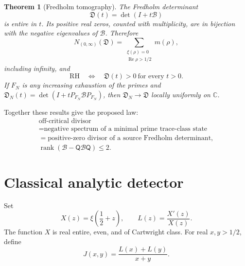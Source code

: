 \documentclass[11pt]{article}
\newtheorem{theorem}{Theorem}[section]
\theoremstyle{definition}
\theoremstyle{remark}
\newcommand{\C}{\mathbb C}
\newcommand{\cB}{\mathcal B}
\newcommand{\rank}{\operatorname{rank}}
\newcommand{\Rea}{\operatorname{Re}}
\begin{document}
\begin{theorem}[Fredholm tomography]
\label{thm:fredholm}
The Fredholm determinant
\begin{equation}
 \mathfrak D(t)=\det(I+t\cB)                               \tag{1.14}
\end{equation}
is entire in $t$.  Its positive real zeros, counted with multiplicity, are in bijection with the
negative eigenvalues of $\cB$.  Therefore
\begin{equation}
 N_{(0,\infty)}(\mathfrak D)
 =\sum_{\substack{\xi(\rho)=0\\\Rea\rho>1/2}}m(\rho),       \tag{1.15}
\end{equation}
including infinity, and
\begin{equation}
 \mathrm{RH}
 \quad\Longleftrightarrow\quad
 \mathfrak D(t)>0\ \text{for every }t>0.                   \tag{1.16}
\end{equation}
If $F_N$ is any increasing exhaustion of the primes and
$\mathfrak D_N(t)=\det(I+tP_{F_N}\cB P_{F_N})$, then
$\mathfrak D_N\to\mathfrak D$ locally uniformly on $\C$.
\end{theorem}

Together these results give the proposed law:
\[
 \boxed{
 \begin{gathered}
 \text{off-critical divisor}\\
 =\text{negative spectrum of a minimal prime trace-class state}\\
 =\text{positive-zero divisor of a source Fredholm determinant},\\
 \rank(\cB-\mathsf Q\cB\mathsf Q)\leq2.
 \end{gathered}}                                           \tag{1.17}
\]

\section{Classical analytic detector}
\label{sec:detector}

Set
\begin{equation}
 X(z)=\xi\!\left(\frac12+z\right),\qquad
 L(z)=\frac{X'(z)}{X(z)}.                                  \tag{2.1}
\end{equation}
The function $X$ is real entire, even, and of Cartwright class.  For real $x,y>1/2$, define
\begin{equation}
 J(x,y)=\frac{L(x)+L(y)}{x+y}.                             \tag{2.2}
\end{equation}
\end{document}

